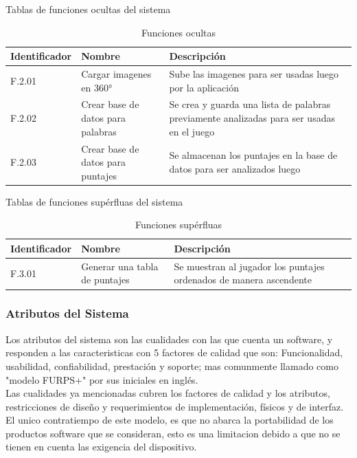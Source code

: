 Tablas de funciones ocultas del sistema
\begin{table}[H]
    \begin{center}
        \begin{tabular}{| m{2.3cm} | m{5cm} | m{8cm} |}        
        	\hline 
        	Identificador & Nombre & Descripción\\
        	\hline
        	F.2.01 & Cargar imagenes en 360° & Sube las imagenes para ser usadas luego por la aplicación\\
        	\hline
        	F.2.02 & Crear base de datos para palabras & Se crea y guarda una lista de palabras previamente analizadas para ser usadas en el juego\\
        	\hline
        	F.2.03 & Crear base de datos para puntajes & Se almacenan los puntajes en la base de datos para ser analizados luego\\
        	\hline
        \end{tabular}
    \caption{Funciones ocultas}
    \end{center}
\end{table}

Tablas de funciones supérfluas del sistema
\begin{table}[H]
    \begin{center}
        \begin{tabular}{| m{2.3cm} | m{5cm} | m{8cm} |}        
        	\hline 
        	Identificador & Nombre & Descripción\\
        	\hline
        	F.3.01 & Generar una tabla de puntajes & Se muestran al jugador los puntajes ordenados de manera ascendente\\
        	\hline
        \end{tabular}
    \caption{Funciones supérfluas}
    \end{center}
\end{table}
\newpage
\subsubsection{Atributos del Sistema}
Los atributos del sistema son las cualidades con las que cuenta un software, y responden a las caracteristicas con 5 factores de calidad  que son: Funcionalidad, usabilidad, confiabilidad, prestación y soporte; mas comunmente llamado como "modelo FURPS+" por sus iniciales en inglés.\\
Las cualidades ya mencionadas cubren los factores de calidad y los atributos, restricciones de diseño y requerimientos de implementación, físicos y de interfaz. El unico contratiempo de este modelo, es que no abarca la portabilidad de los productos software que se consideran, esto es una limitacion debido a que no se tienen en cuenta las exigencia del dispositivo.

